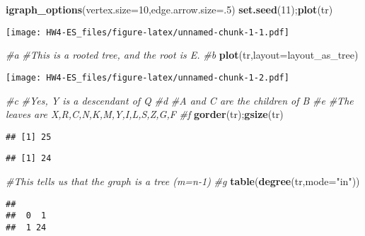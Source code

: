 \documentclass[
]{article}
\newenvironment{Shaded}{\begin{snugshade}}{\end{snugshade}}
\newcommand{\CommentTok}[1]{\textcolor[rgb]{0.56,0.35,0.01}{\textit{#1}}}
\newcommand{\DataTypeTok}[1]{\textcolor[rgb]{0.13,0.29,0.53}{#1}}
\newcommand{\DecValTok}[1]{\textcolor[rgb]{0.00,0.00,0.81}{#1}}
\newcommand{\KeywordTok}[1]{\textcolor[rgb]{0.13,0.29,0.53}{\textbf{#1}}}
\newcommand{\NormalTok}[1]{#1}
\newcommand{\StringTok}[1]{\textcolor[rgb]{0.31,0.60,0.02}{#1}}
\begin{document}
\begin{Shaded}
\begin{Highlighting}[]
\KeywordTok{igraph_options}\NormalTok{(}\DataTypeTok{vertex.size=}\DecValTok{10}\NormalTok{,}\DataTypeTok{edge.arrow.size=}\NormalTok{.}\DecValTok{5}\NormalTok{)}
\KeywordTok{set.seed}\NormalTok{(}\DecValTok{11}\NormalTok{);}\KeywordTok{plot}\NormalTok{(tr)}
\end{Highlighting}
\end{Shaded}

\texttt{[image: HW4-ES\_files/figure-latex/unnamed-chunk-1-1.pdf]}

\begin{Shaded}
\begin{Highlighting}[]
\CommentTok{#a}
\CommentTok{#This is a rooted tree, and the root is E.}
\CommentTok{#b}
\KeywordTok{plot}\NormalTok{(tr,}\DataTypeTok{layout=}\NormalTok{layout_as_tree)}
\end{Highlighting}
\end{Shaded}

\texttt{[image: HW4-ES\_files/figure-latex/unnamed-chunk-1-2.pdf]}

\begin{Shaded}
\begin{Highlighting}[]
\CommentTok{#c}
\CommentTok{#Yes, Y is a descendant of Q}
\CommentTok{#d}
\CommentTok{#A and C are the children of B}
\CommentTok{#e}
\CommentTok{#The leaves are X,R,C,N,K,M,Y,I,L,S,Z,G,F}
\CommentTok{#f}
\KeywordTok{gorder}\NormalTok{(tr);}\KeywordTok{gsize}\NormalTok{(tr)}
\end{Highlighting}
\end{Shaded}

\begin{verbatim}
## [1] 25
\end{verbatim}

\begin{verbatim}
## [1] 24
\end{verbatim}

\begin{Shaded}
\begin{Highlighting}[]
\CommentTok{#This tells us that the graph is a tree (m=n-1)}
\CommentTok{#g}
\KeywordTok{table}\NormalTok{(}\KeywordTok{degree}\NormalTok{(tr,}\DataTypeTok{mode=}\StringTok{"in"}\NormalTok{))}
\end{Highlighting}
\end{Shaded}

\begin{verbatim}
## 
##  0  1 
##  1 24
\end{verbatim}
\end{document}
